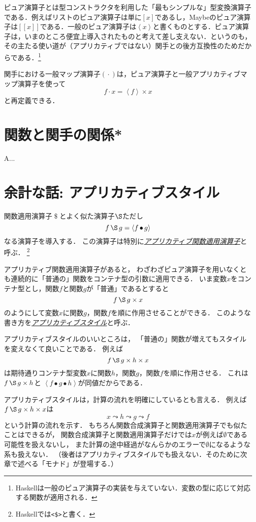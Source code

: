 \documentclass[a5paper,draft]{jsbook}
\def\[{\left[\!\left[}
\def\]{\right]\!\right]}
\newcommand{\programminglanguage}[1]{\textsf{#1}}
\newcommand{\haskell}{\programminglanguage{Haskell}}
\newcommand{\keyword}[1]{{\underline{\emph{#1}}}}
\newcommand{\code}[1]{\texttt{#1}}
\newcommand{\mathMaybeWith}[1]{\[#1\]}
\newcommand{\mathPureWith}[1]{\left\langle#1\right\rangle}
\newcommand{\mathNothing}{\emptyset}%
\newcommand{\mathBinaryOperator}[1]{\operatorname{#1}}
\newcommand{\mathApplicativeApply}{\mathBinaryOperator{\S}}
\newcommand{\mathApplicativeGeneralMap}{\times}
\newcommand{\mathApply}{\mathBinaryOperator{\$}}
\newcommand{\mathCompose}{\mathBinaryOperator{\bullet}}
\newcommand{\mathGeneralMap}{\mathBinaryOperator{\cdot}}
\begin{document}
ピュア演算子とは型コンストラクタを利用した「最もシンプルな」型変換演算子である．例えばリストのピュア演算子は単に$[x]$であるし，Maybeのピュア演算子は$\mathMaybeWith{x}$である．一般のピュア演算子は$\mathPureWith{x}$と書くものとする．ピュア演算子は，いまのところ便宜上導入されたものと考えて差し支えない．というのも，その主たる使い道が（アプリカティブではない）関手との後方互換性のためだからである．\footnote{\haskell は一般のピュア演算子の実装を与えていない．変数の型に応じて対応する関数が適用される．}

関手における一般マップ演算子$(\mathGeneralMap)$は，ピュア演算子と一般アプリカティブマップ演算子を使って$$f\mathGeneralMap x=\mathPureWith{f}\mathApplicativeGeneralMap x$$と再定義できる．

\section{関数と関手の関係*}

A...

\section{余計な話: アプリカティブスタイル}

関数適用演算子$\mathApply$とよく似た演算子$\mathApplicativeApply$ただし
$$
f\mathApplicativeApply g=\mathPureWith{f\mathCompose g}
$$
なる演算子を導入する．
この演算子は特別に\keyword{アプリカティブ関数適用演算子}と呼ぶ．%
\footnote{\haskell では\code{<\$>}と書く．}

アプリカティブ関数適用演算子があると，
わざわざピュア演算子を用いなくとも連続的に「普通の」関数をコンテナ型の引数に適用できる．
いま変数$x$をコンテナ型とし，関数$f$と関数$g$が「普通」であるとすると
$$
f\mathApplicativeApply g\mathApplicativeGeneralMap x
$$
のようにして変数$x$に関数$g$，関数$f$を順に作用させることができる．
このような書き方を\keyword{アプリカティブスタイル}と呼ぶ．

アプリカティブスタイルのいいところは，
「普通の」関数が増えてもスタイルを変えなくて良いことである．
例えば
$$
f\mathApplicativeApply g\mathApplicativeGeneralMap h\mathApplicativeGeneralMap x
$$
は期待通りコンテナ型変数$x$に関数$h$，関数$g$，関数$f$を順に作用させる．
これは$f\mathApplicativeApply g\mathApplicativeGeneralMap h$と%
$\mathPureWith{f\mathCompose g\mathCompose h}$が同値だからである．

アプリカティブスタイルは，計算の流れを明確にしているとも言える．
例えば$f\mathApplicativeApply g\mathApplicativeGeneralMap h\mathApplicativeGeneralMap x$は
$$
x\leadsto h\leadsto g\leadsto f
$$
という計算の流れを示す．
もちろん関数合成演算子と関数適用演算子でも似たことはできるが，
関数合成演算子と関数適用演算子だけでは$x$が例えば$\mathNothing$である可能性を扱えないし，
また計算の途中経過がなんらかのエラーで$\mathNothing$になるような系も扱えない．
（後者はアプリカティブスタイルでも扱えない．そのために次章で述べる「モナド」が登場する．）
\end{document}
